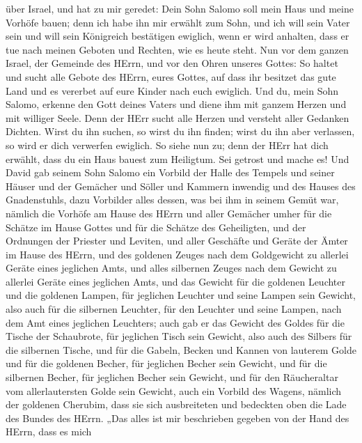 über Israel,  und hat zu mir geredet: Dein Sohn Salomo soll
mein Haus und meine Vorhöfe bauen; denn ich habe ihn mir erwählt zum
Sohn, und ich will sein Vater sein  und will sein Königreich
bestätigen ewiglich, wenn er wird anhalten, dass er tue nach meinen
Geboten und Rechten, wie es heute steht.  Nun vor dem ganzen
Israel, der Gemeinde des HErrn, und vor den Ohren unseres Gottes: So
haltet und sucht alle Gebote des HErrn, eures Gottes, auf dass ihr
besitzet das gute Land und es vererbet auf eure Kinder nach euch
ewiglich.  Und du, mein Sohn Salomo, erkenne den Gott deines
Vaters und diene ihm mit ganzem Herzen und mit williger Seele. Denn der
HErr sucht alle Herzen und versteht aller Gedanken Dichten. Wirst du ihn
suchen, so wirst du ihn finden; wirst du ihn aber verlassen, so wird er
dich verwerfen ewiglich.  So siehe nun zu; denn der HErr
hat dich erwählt, dass du ein Haus bauest zum Heiligtum. Sei getrost und
mache es!  Und David gab seinem Sohn Salomo ein Vorbild der
Halle des Tempels und seiner Häuser und der Gemächer und Söller und
Kammern inwendig und des Hauses des Gnadenstuhls,  dazu
Vorbilder alles dessen, was bei ihm in seinem Gemüt war, nämlich die
Vorhöfe am Hause des HErrn und aller Gemächer umher für die Schätze im
Hause Gottes und für die Schätze des Geheiligten,  und der
Ordnungen der Priester und Leviten, und aller Geschäfte und Geräte der
Ämter im Hause des HErrn,  und des goldenen Zeuges nach dem
Goldgewicht zu allerlei Geräte eines jeglichen Amts, und alles silbernen
Zeuges nach dem Gewicht zu allerlei Geräte eines jeglichen Amts,
 und das Gewicht für die goldenen Leuchter und die goldenen
Lampen, für jeglichen Leuchter und seine Lampen sein Gewicht, also auch
für die silbernen Leuchter, für den Leuchter und seine Lampen, nach dem
Amt eines jeglichen Leuchters;  auch gab er das Gewicht des
Goldes für die Tische der Schaubrote, für jeglichen Tisch sein Gewicht,
also auch des Silbers für die silbernen Tische,  und für
die Gabeln, Becken und Kannen von lauterem Golde und für die goldenen
Becher, für jeglichen Becher sein Gewicht, und für die silbernen Becher,
für jeglichen Becher sein Gewicht,  und für den
Räucheraltar vom allerlautersten Golde sein Gewicht, auch ein Vorbild
des Wagens, nämlich der goldenen Cherubim, dass sie sich ausbreiteten
und bedeckten oben die Lade des Bundes des HErrn.  „Das
alles ist mir beschrieben gegeben von der Hand des HErrn, dass es mich
